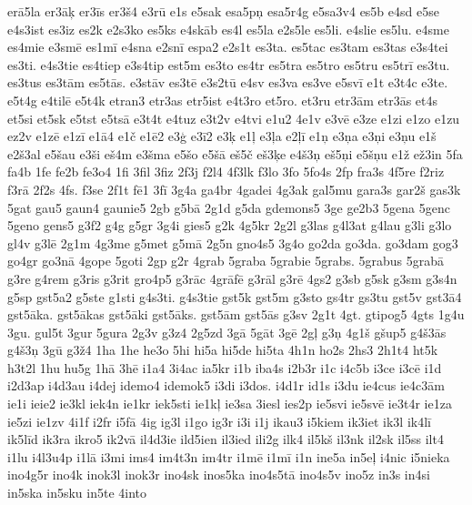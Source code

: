 {{er\={a}5la er3\={a}\c{k} er3\={i}s er3\v{s}4 e3r\={u} e1s
e5sak esa5p\c{n} esa5r4g e5sa3v4 es5b e4sd e5se e4s3ist es3iz es2k
e2s3ko es5ks e4sk\={a}b es4l es5la e2s5le es5li. e4slie es5lu. e4sme
es4mie e3sm\={e} es1m\={i} e4sna e2sn\={i} espa2 e2s1t es3ta. es5tac
es3tam es3tas e3s4tei es3ti. e4s3tie es4tiep e3s4tip est5m es3to
es4tr es5tra es5tro es5tru es5tr\={i} es3tu. es3tus es3t\={a}m
es5t\={a}s. e3st\={a}v es3t\={e} e3s2t\={u} e4sv es3va es3ve
e5sv\={i} e1t e3t4c e3te. e5t4g e4til\={e} e5t4k etran3 etr3as etr5ist
e4t3ro et5ro. et3ru etr3\={a}m etr3\={a}s et4s et5si et5sk e5tst
e5ts\={a} e3t4t e4tuz e3t2v e4tvi e1u2 4e1v e3v\={e} e3ze e1zi e1zo
e1zu ez2v e1z\={e} e1z\={i} e1\={a}4 e1\v{c} e1\={e}2 e3\c{g} e3\={i}2
e3\c{k} e1\c{l} e3\c{l}a e2\c{l}\={i} e1\c{n} e3\c{n}a e3\c{n}i
e3\c{n}u e1\v{s} e2\v{s}3al e5\v{s}au e3\v{s}i e\v{s}4m e3\v{s}ma
e5\v{s}o e5\v{s}\={a} e\v{s}5\v{c} e\v{s}3\c{k}e e4\v{s}3\c{n}
e\v{s}5\c{n}i e5\v{s}\c{n}u e1\v{z} e\v{z}3in 5fa fa4b
1fe fe2b fe3o4 1fi 3fil 3fiz 2f3j f2l4 4f3lk f3lo 3fo 5fo4s 2fp fra3s
4f5re f2riz f3r\={a} 2f2s 4fs. f3se 2f1t f\={e}1 3f\={i} 3g4a ga4br
4gadei 4g3ak gal5mu gara3s gar2\v{s} gas3k 5gat gau5 gaun4 gaunie5
2gb g5b\={a} 2g1d g5da gdemons5 3ge ge2b3 5gena 5genc 5geno gens5
g3f2 g4g g5gr 3g4i gies5 g2k 4g5kr 2g2l g3las g4l3at g4lau g3li g3lo
gl4v g3l\={e} 2g1m 4g3me g5met g5m\={a} 2g5n gno4s5 3g4o go2da go3da.
go3dam gog3 go4gr go3n\={a} 4gope 5goti 2gp g2r 4grab 5graba 5grabie
5grabs. 5grabus 5grab\={a} g3re g4rem g3ris g3rit gro4p5 g3r\={a}c
4gr\={a}f\={e} g3r\={a}l g3r\={e} 4gs2 g3sb g5sk g3sm g3s4n
g5sp gst5a2 g5ste g1sti g4s3ti. g4s3tie gst5k gst5m g3sto gs4tr gs3tu
gst5v gst3\={a}4 gst5\={a}ka. gst5\={a}kas gst5\={a}ki gst5\={a}ks.
gst5\={a}m gst5\={a}s g3sv 2g1t 4gt. gtipog5 4gts 1g4u 3gu.
gul5t 3gur 5gura 2g3v g3z4 2g5zd 3g\={a} 5g\={a}t 3g\={e} 2g\c{l}
g3\c{n} 4g1\v{s} g\v{s}up5 g4\v{s}3\={a}s g4\v{s}3\c{n} 3g\={u}
g3\v{z}4 1ha 1he he3o 5hi hi5a hi5de hi5ta 4h1n ho2s 2hs3 2h1t4 ht5k
h3t2l 1hu hu5g 1h\={a} 3h\={e} i1a4 3i4ac ia5kr i1b iba4s i2b3r i1c
i4c5b i3ce i3c\={e} i1d i2d3ap i4d3au i4dej idemo4 idemok5 i3di i3dos.
i4d1r id1s i3du ie4cus ie4c3\={a}m ie1i ieie2 ie3kl iek4n ie1kr
iek5sti ie1k\c{l} ie3sa 3iesl ies2p ie5svi ie5sv\={e} ie3t4r ie1za
ie5zi ie1zv 4i1f i2fr i5f\={a} 4ig ig3l i1go ig3r i3i i1j ikau3 i5kiem
ik3iet ik3l ik4l\={i} ik5l\={i}d ik3ra ikro5 ik2v\={a} il4d3ie
ild5ien il3ied ili2g ilk4 il5k\v{s} il3nk il2sk il5ss ilt4 i1lu
i4l3u4p i1l\={a} i3mi ims4 im4t3n im4tr i1m\={e} i1m\={i} i1n ine5a
in5e\c{l} i4nic i5nieka ino4g5r ino4k inok3l inok3r ino4sk inos5ka
ino4s5t\={a} ino4s5v ino5z in3s in4si in5ska in5sku in5te 4into
}}
